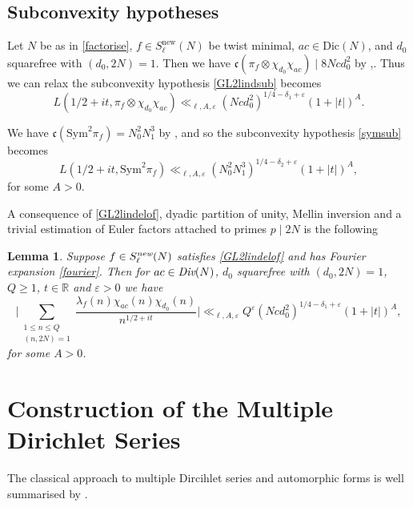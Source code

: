 \documentclass[12pt,reqno]{amsart}
\theoremstyle{plain}
\newtheorem{lemma}{Lemma}
\theoremstyle{remark}
\numberwithin{equation}{section}
\numberwithin{lemma}{section}
\numberwithin{theorem}{section}
\numberwithin{prop}{section}
\numberwithin{remark}{section}
\begin{document}
\subsection{Subconvexity hypotheses}
Let $N$ be as in \eqref{factorise}, $f \in S^{\text{new}}_{\ell}(N)$ be twist minimal,  
$a c \in \text{Dic}(N)$, and $d_0$ squarefree with $(d_0,2N)=1$.
Then we have 
$\mathfrak{c}(\pi_f \otimes \chi_{d_0} \chi_{ac}) \mid 8 Nc d_0^2$ by \cite[Proposition~3.1]{AL},.
Thus we can relax the subconvexity hypothesis \eqref{GL2lindsub} becomes
\begin{equation} \label{GL2lindelof}
L(1/2+it,\pi_f \otimes \chi_{d_0} \chi_{ac}) \ll_{\ell,A,\varepsilon}  (Ncd_0^2)^{1/4-\delta_1+\varepsilon} (1+|t|)^{A}.
\end{equation}

We have $\mathfrak{c}(\text{Sym}^2 \pi_f)=N_0^2 N_1^3$ by \cite[Example~1]{Li2}, 
and so the
subconvexity hypothesis \eqref{symsub} becomes
\begin{equation} \label{GL3lindelof}
L(1/2+it,\text{Sym}^2 \pi_f)  \ll_{\ell,A,\varepsilon} (N_0^2 N_1^3)^{1/4-\delta_2+\varepsilon} (1+|t|)^{A},
\end{equation}
for some $A>0$. 

A consequence of \eqref{GL2lindelof}, dyadic partition of unity, Mellin inversion and a 
trivial estimation of Euler factors attached to primes $p \mid 2N$
is the following
\begin{lemma} \label{lindelof}
Suppose $f \in S^{\emph{new}}_{\ell}(N)$ satisfies \eqref{GL2lindelof} and has
Fourier expansion \eqref{fourier}.
Then for $ac \in \emph{Div}(N)$, $d_0$ squarefree with $(d_0,2N)=1$,
 $Q \geq 1$, $t \in \mathbb{R}$ and $\varepsilon>0$ we have 
\begin{equation*}
\bigg| \sum_{\substack{1 \leq n \leq Q \\ (n,2N)=1}} 
\frac{\lambda_f(n) \chi_{a c}(n) \chi_{d_0}(n)}{n^{1/2+it}} \bigg | 
 \ll_{\ell,A,\varepsilon}   Q^{\varepsilon} (Ncd_0^2)^{1/4-\delta_1+\varepsilon} (1+|t|)^{A},
\end{equation*}
for some $A>0$.
\end{lemma}

\section{Construction of the Multiple Dirichlet Series} \label{constrmds}

The classical approach to multiple Dircihlet series and automorphic forms is well summarised by 
\cite{BFH,BBCFH}. 
\end{document}
